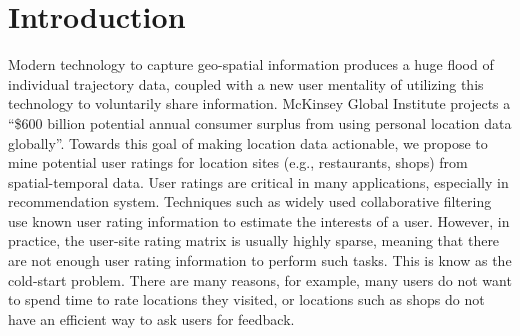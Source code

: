 \section{Introduction}\label{sec:intro}
Modern technology to capture geo-spatial information produces a
huge flood of individual trajectory data, coupled with a new
user mentality of utilizing this technology to voluntarily share information.
McKinsey Global Institute \cite{manyika2011big} projects a ``\$600 billion
potential annual consumer surplus from using personal location data globally''.
Towards this goal of making location data actionable, we propose to mine potential user ratings for location sites (e.g., restaurants, shops) from spatial-temporal data. User ratings are critical in many applications, especially in recommendation system. Techniques such as widely used collaborative filtering use known user rating information to estimate the interests of a user. However, in practice, the user-site rating matrix is usually highly sparse, meaning that there are not enough user rating information to perform such tasks. This is know as the cold-start problem. There are many reasons, for example, many users do not want to spend time to rate locations they visited, or locations such as shops do not have an efficient way to ask users for feedback.

